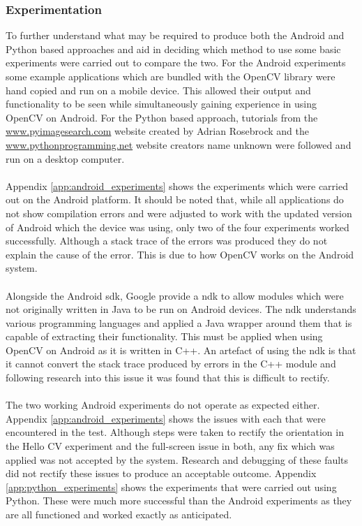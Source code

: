 	\subsubsection{Experimentation}
		To further understand what may be required to produce both the Android and Python based approaches and aid in deciding which method to use some basic experiments were carried out to compare the two. For the Android experiments some example applications which are bundled with the OpenCV library were hand copied and run on a mobile device. This allowed their output and functionality to be seen while simultaneously gaining experience in using OpenCV on Android. For the Python based approach, tutorials from the \url{www.pyimagesearch.com} website created by Adrian Rosebrock \citep{pyimagesearch} and the \url{www.pythonprogramming.net} website \citep{pythonprogramming} creators name unknown were followed and run on a desktop computer.
		\\\\
		Appendix \ref{app:android_experiments} shows the experiments which were carried out on the Android platform. It should be noted that, while all applications do not show compilation errors and were adjusted to work with the updated version of Android which the device was using, only two of the four experiments worked successfully. Although a stack trace of the errors was produced they do not explain the cause of the error. This is due to how OpenCV works on the Android system.
		\\\\
		Alongside the Android \gls{sdk}, Google provide a \gls{ndk} to allow modules which were not originally written in Java to be run on Android devices. The \gls{ndk} understands various programming languages and applied a Java wrapper around them that  is capable of extracting their functionality. This must be applied when using OpenCV on Android as it is written in C++. An artefact of using the \gls{ndk} is that it cannot convert the stack trace produced by errors in the C++ module and following  research into this issue it was found that this is difficult to rectify.
		\\\\
		The two working Android experiments do not operate as expected either. Appendix \ref{app:android_experiments} shows the issues with each that were encountered in the test.  Although steps were taken to rectify the orientation in the Hello CV experiment and the full-screen issue in both, any fix which was applied was not accepted by the system. Research and debugging of these faults did not rectify these issues to produce an acceptable outcome.  Appendix \ref{app:python_experiments} shows the experiments that  were carried out using Python. These were much more successful than the Android experiments as they are all functioned and worked exactly as anticipated.
